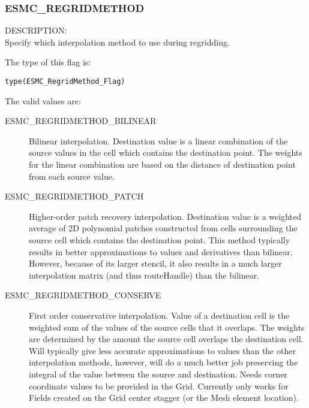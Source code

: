 
\subsubsection{ESMC\_REGRIDMETHOD}
\label{opt:cregridmethod}

{\sf DESCRIPTION:\\}  
Specify which interpolation method to use during regridding. 

The type of this flag is:

{\tt type(ESMC\_RegridMethod\_Flag)}

The valid values are:
\begin{description}
\item [ESMC\_REGRIDMETHOD\_BILINEAR]
      Bilinear interpolation. Destination value is a linear combination of the source values in the cell which contains the destination point. The weights for the linear combination are based on the distance of destination point from each source value. 
\item [ESMC\_REGRIDMETHOD\_PATCH]
      Higher-order patch recovery interpolation. Destination value is a weighted average of 2D polynomial patches constructed from cells surrounding the source cell which contains the destination point. This method typically results in better approximations to values and derivatives than bilinear. However, because of its larger stencil, it also results in a much larger interpolation matrix (and thus routeHandle) than the bilinear. 
\item [ESMC\_REGRIDMETHOD\_CONSERVE]
      First order conservative interpolation. Value of a destination cell is the weighted sum of the values of the source cells that it overlaps. The weights are determined by the amount the source cell overlaps the destination cell. Will typically give less accurate approximations to values than the other interpolation methods, however, will do a much better job preserving the integral of the value between the source and destination.  Needs corner coordinate values to be provided in the Grid. Currently only works for Fields created on the Grid center stagger (or the Mesh element location). 
\end{description}
